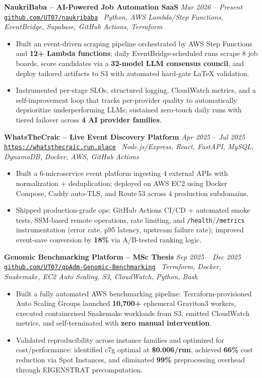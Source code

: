 \documentclass[10pt,a4paper]{article}
\newcommand{\projectentryurl}[5]{%
  \Needspace{3\baselineskip}%
  \textbf{#1} \hfill \textit{#2}\\[-0.15em]
  {\small\href{#3}{\texttt{#4}}} \textbar\ \textit{#5}\\[-0.25em]
}
\begin{document}
\vspace{0.10em}
\projectentryurl{NaukriBaba -- AI-Powered Job Automation SaaS}{Mar 2026 -- Present}{https://github.com/UT07/naukribaba}{github.com/UT07/naukribaba}{Python, AWS Lambda/Step Functions, EventBridge, Supabase, GitHub Actions, Terraform}
\begin{itemize}
  \item Built an event-driven scraping pipeline orchestrated by AWS Step Functions and \textbf{12+ Lambda functions}; daily EventBridge-scheduled runs scrape 8 job boards, score candidates via a \textbf{32-model LLM consensus council}, and deploy tailored artifacts to S3 with automated hard-gate LaTeX validation.
  \item Instrumented per-stage SLOs, structured logging, CloudWatch metrics, and a self-improvement loop that tracks per-provider quality to automatically deprioritize underperforming LLMs; sustained zero-touch daily runs with tiered failover across \textbf{4 AI provider families}.
\end{itemize}

\vspace{0.10em}
\projectentryurl{WhatsTheCraic -- Live Event Discovery Platform}{Apr 2025 -- Jul 2025}{https://github.com/UT07/whatsthecraic}{https://whatsthecraic.run.place}{Node.js/Express, React, FastAPI, MySQL, DynamoDB, Docker, AWS, GitHub Actions}
\begin{itemize}
  \item Built a 6-microservice event platform ingesting 4 external APIs with normalization + deduplication; deployed on AWS EC2 using Docker Compose, Caddy auto-TLS, and Route\,53 across 4 production subdomains.
  \item Shipped production-grade ops: GitHub Actions CI/CD + automated smoke tests, SSM-based remote operations, rate limiting, and \texttt{/health}/\texttt{/metrics} instrumentation (error rate, p95 latency, upstream failure rate); improved event-save conversion by \textbf{18\%} via A/B-tested ranking logic.
\end{itemize}

\vspace{0.10em}
\projectentryurl{Genomic Benchmarking Platform -- MSc Thesis}{Sep 2025 -- Dec 2025}{https://github.com/UT07/Performance-Optimization-and-Cost-Analysis-of-qpAdm-Genomic-Modeling}{github.com/UT07/qpAdm-Genomic-Benchmarking}{Terraform, Docker, Snakemake, EC2 Auto Scaling, S3, CloudWatch, Python, Bash}
\begin{itemize}
  \item Built a fully automated AWS benchmarking pipeline: Terraform-provisioned Auto Scaling Groups launched \textbf{10,700+} ephemeral Graviton3 workers, executed containerised Snakemake workloads from S3, emitted CloudWatch metrics, and self-terminated with \textbf{zero manual intervention}.
  \item Validated reproducibility across instance families and optimized for cost/performance: identified c7g optimal at \textbf{\$0.006/run}, achieved \textbf{66\%} cost reduction via Spot Instances, and eliminated \textbf{99\%} preprocessing overhead through EIGENSTRAT precomputation.
\end{itemize}
\end{document}

